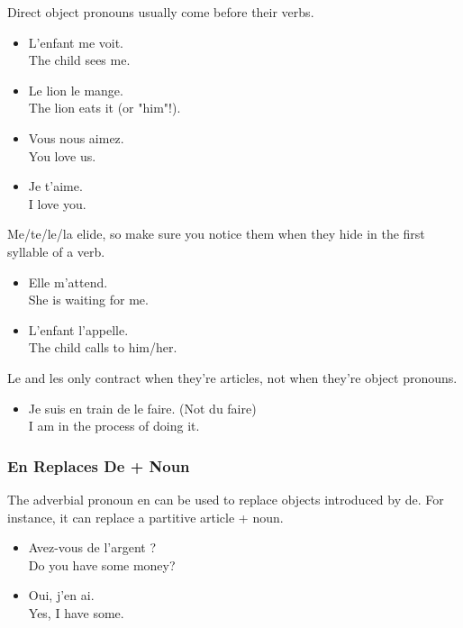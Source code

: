 Direct object pronouns usually come before their verbs.

\begin{itemize}
  \item  L'enfant me voit. \\ The child sees me.
  \item  Le lion le mange. \\ The lion eats it (or "him"!).
  \item  Vous nous aimez. \\ You love us.
  \item  Je t'aime. \\ I love you.
\end{itemize}

Me/te/le/la elide, so make sure you notice them when they hide in the first syllable of a verb.

\begin{itemize}
  \item  Elle m'attend. \\ She is waiting for me.
  \item  L'enfant l'appelle. \\ The child calls to him/her.
\end{itemize}

Le and les only contract when they're articles, not when they're object pronouns.

\begin{itemize}
  \item  Je suis en train de le faire. (Not du faire) \\ I am in the process of doing it.
\end{itemize}

\subsubsection{En Replaces De + Noun}

The adverbial pronoun \guillemotleft en \guillemotright can be used to replace objects introduced by de. For instance, it can replace a partitive article + noun.

\begin{itemize}
  \item  Avez-vous de l'argent ? \\ Do you have some money?
  \item  Oui, j'en ai. \\ Yes, I have some.
\end{itemize}

